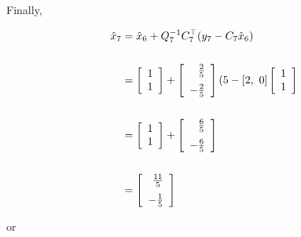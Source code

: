 \documentclass[letterpaper]{article}
\begin{document}
\begin{enumerate}
 Finally,

 \begin{align*}
 \hat{x}_{7}& =\hat{x}_6+Q_{7}^{-1} C_{7}^\top (y_{7}-C_{7}\hat{x}_6)\\
 \\
 &=\left[ \begin{array}{c} 1 \\ 1 \end{array} \right] + \left[ \begin{array}{r} \frac{2}{5}  \medskip \\ -\frac{2}{5}\end{array} \right] ( 5 - [2,~0] \left[ \begin{array}{c} 1 \\ 1 \end{array} \right] \\
 \\
 &=\left[ \begin{array}{c} 1 \\ 1 \end{array} \right] + \left[ \begin{array}{r} \frac{6}{5}  \medskip \\ -\frac{6}{5}\end{array} \right] \\
 \\
 &= \left[ \begin{array}{r} \frac{11}{5}  \medskip \\ -\frac{1}{5}\end{array} \right]
 \end{align*}

 or


\end{enumerate}
\end{document}
